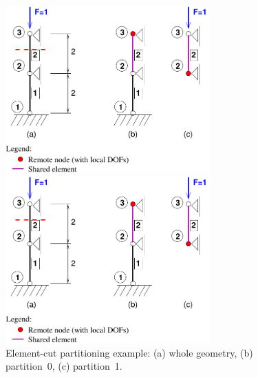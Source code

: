 \documentclass[a4paper]{article}
\begin{document}
\begin{figure}[htb]
\begin{htmlonly}
  \centerline{\includegraphics[width=0.7\textwidth]{poofem_ex02}}
\end{htmlonly}
\centerline{\includegraphics[width=0.7\textwidth]{poofem_ex02}}
\caption{Element-cut partitioning example: (a) whole geometry,
(b) partition~0, (c) partition~1.}
\label{elmentcut-ex02}
\end{figure}
\end{document}
